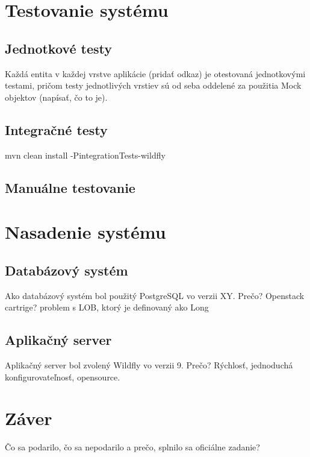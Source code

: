 \documentclass[12pt,oneside]{fithesis2}
\begin{document}
    \chapter{Testovanie systému}
      \section{Jednotkové testy}
      \par Každá entita v každej vrstve aplikácie (pridať odkaz) je otestovaná jednotkovými testami, pričom testy jednotlivých vrstiev sú od seba oddelené za použitia Mock objektov (napísať, čo to je).
      \section{Integračné testy}
      \par mvn clean install -PintegrationTests-wildfly
      \section{Manuálne testovanie}
    \chapter{Nasadenie systému} \label{nasadenie}
      \section{Databázový systém}
      \par Ako databázový systém bol použitý PostgreSQL vo verzii XY. Prečo? Openstack cartrige? problem s LOB, ktorý je definovaný ako Long
      \section{Aplikačný server}
      \par Aplikačný server bol zvolený Wildfly vo verzii 9. Prečo? Rýchlosť, jednoduchá konfigurovateľnosť, opensource.
    \chapter{Záver}   
       \par Čo sa podarilo, čo sa nepodarilo a prečo, splnilo sa oficiálne zadanie?
       
\end{document}
